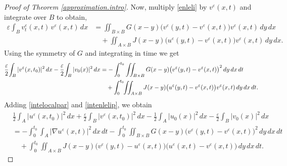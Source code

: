 \documentclass[10pt,a4paper]{amsart}
\begin{document}
\begin{proof}[Proof of Theorem \ref{approximation.intro}]
Now, multiply \eqref{enleli} by $v^\varepsilon(x,t)$ and integrate over $B$ to obtain,
\begin{align*}
\varepsilon\!\int_B v_t^\varepsilon(x,t)\,v^\varepsilon(x,t)\,dx
&=
\iint_{B\times B}
 G(x-y)\big( v^\varepsilon(y,t)-v^\varepsilon(x,t) \big)
 v^\varepsilon(x,t)\,dy\,dx
\\
&\quad
+\iint_{A\times B}
 J(x-y)\big( u^\varepsilon(y,t)-v^\varepsilon(x,t) \big)
 v^\varepsilon(x,t)\,dy\,dx.
\end{align*}
Using the symmetry of $G$ and integrating in time we get
\begin{align}\label{intenlelip}
\frac{\varepsilon}{2}\!\int_B |v^\varepsilon(x,{t_0})|^2\,dx
-\frac{\varepsilon}{2}\!\int_B |v_0(x)|^2\,dx
&=
-\int_0^{t_0} \iint_{B\times B}
 G(x-y)\big( v^\varepsilon(y,t)-v^\varepsilon(x,t) \big)^2
\,dy\,dx\,dt
\notag\\
&\quad
+\int_0^{t_0}\!\!\iint_{A\times B}
 J(x-y)\big( u^\varepsilon(y,t)-v^\varepsilon(x,t) \big)
 v^\varepsilon(x,t)\,dy\,dx\,dt.
\end{align}
Adding \eqref{intelocalpar} and \eqref{intenlelip}, we obtain
\begin{align*}
&\frac12\!\int_A |u^\varepsilon(x,{t_0})|^2\,dx
+\frac{\varepsilon}{2}\!\int_B |v^\varepsilon(x,{t_0})|^2\,dx
-\frac12\!\int_A |u_0(x)|^2\,dx
-\frac{\varepsilon}{2}\!\int_B |v_0(x)|^2\,dx
\\[0.4em]
&=
-\int_0^{t_0}\!\!\int_A |\nabla u^\varepsilon(x,t)|^2\,dx\,dt
-\int_0^{t_0}\!\!\iint_{B\times B}
   G(x-y)\big( v^\varepsilon(y,t)-v^\varepsilon(x,t) \big)^2
\,dy\,dx\,dt
\\
&\quad
+\int_0^{t_0}\!\!\iint_{A\times B}
 J(x-y)\big( v^\varepsilon(y,t)-u^\varepsilon(x,t) \big)
 \big( u^\varepsilon(x,t)-v^\varepsilon(x,t) \big)
\,dy\,dx\,dt.
\end{align*}


\end{proof}
\end{document}
